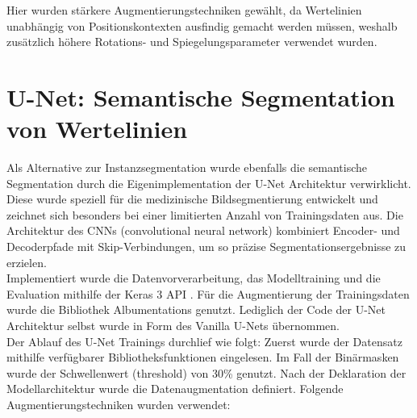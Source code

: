 Hier wurden stärkere Augmentierungstechniken gewählt, da Wertelinien unabhängig von Positionskontexten ausfindig gemacht werden müssen, weshalb zusätzlich höhere Rotations- und Spiegelungsparameter verwendet wurden.


\section{U-Net: Semantische Segmentation von Wertelinien}
\label{ch:unet}

Als Alternative zur Instanzsegmentation wurde ebenfalls die semantische Segmentation durch die Eigenimplementation der U-Net Architektur verwirklicht. Diese wurde speziell für die medizinische Bildsegmentierung entwickelt und zeichnet sich besonders bei einer limitierten Anzahl von Trainingsdaten aus. Die Architektur des CNNs (convolutional neural network) kombiniert Encoder- und Decoderpfade mit Skip-Verbindungen, um so präzise Segmentationsergebnisse zu erzielen.
\\
Implementiert wurde die Datenvorverarbeitung, das Modelltraining und die Evaluation mithilfe der Keras 3 API \cite{chollet2015keras}. Für die Augmentierung der Trainingsdaten wurde die Bibliothek Albumentations \cite{info11020125} genutzt. Lediglich der Code der U-Net Architektur selbst wurde in Form des Vanilla U-Nets \cite{zak2024kerasunet} übernommen.
\\
Der Ablauf des U-Net Trainings durchlief wie folgt:
Zuerst wurde der Datensatz mithilfe verfügbarer Bibliotheksfunktionen eingelesen. Im Fall der Binärmasken wurde der Schwellenwert (threshold) von 30\% genutzt. Nach der Deklaration der Modellarchitektur wurde die Datenaugmentation definiert. Folgende Augmentierungstechniken wurden verwendet:

